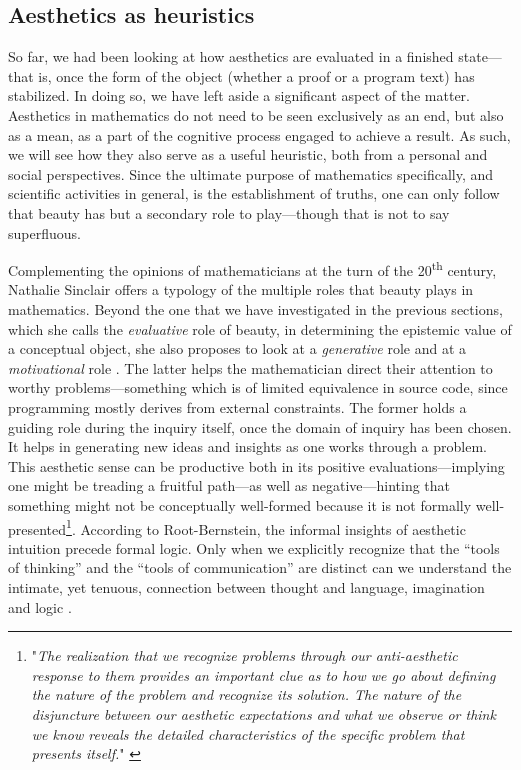 \subsection{Aesthetics as heuristics}
\label{subsec:aesthetics-heuristics}

So far, we had been looking at how aesthetics are evaluated in a finished state—that is, once the form of the object (whether a proof or a program text) has stabilized. In doing so, we have left aside a significant aspect of the matter. Aesthetics in mathematics do not need to be seen exclusively as an end, but also as a mean, as a part of the cognitive process engaged to achieve a result. As such, we will see how they also serve as a useful heuristic, both from a personal and social perspectives. Since the ultimate purpose of mathematics specifically, and scientific activities in general, is the establishment of truths, one can only follow that beauty has but a secondary role to play—though that is not to say superfluous.

Complementing the opinions of mathematicians at the turn of the 20\textsuperscript{th} century, Nathalie Sinclair offers a typology of the multiple roles that beauty plays in mathematics. Beyond the one that we have investigated in the previous sections, which she calls the \emph{evaluative} role of beauty, in determining the epistemic value of a conceptual object, she also proposes to look at a \emph{generative} role and at a \emph{motivational} role \citep{sinclair_aesthetic_2011}. The latter helps the mathematician direct their attention to worthy problems—something which is of limited equivalence in source code, since programming mostly derives from external constraints. The former holds a guiding role during the inquiry itself, once the domain of inquiry has been chosen. It helps in generating new ideas and insights as one works through a problem. This aesthetic sense can be productive both in its positive evaluations—implying one might be treading a fruitful path—as well as negative—hinting that something might not be conceptually well-formed because it is not formally well-presented\footnote{"\emph{The realization that we recognize problems through our anti-aesthetic response to them provides an important clue as to how we go about defining the nature of the problem and recognize its solution. The nature of the disjuncture between our aesthetic expectations and what we observe or think we know reveals the detailed characteristics of the specific problem that presents itself.}" \citep{root-bernstein_aesthetic_2002}}. According to Root-Bernstein, the informal insights of aesthetic intuition precede formal logic. Only when we explicitly recognize that the “tools of thinking” and the “tools of communication” are distinct can we understand the intimate, yet tenuous, connection between thought and language, imagination and logic \citep{root-bernstein_aesthetic_2002}.

